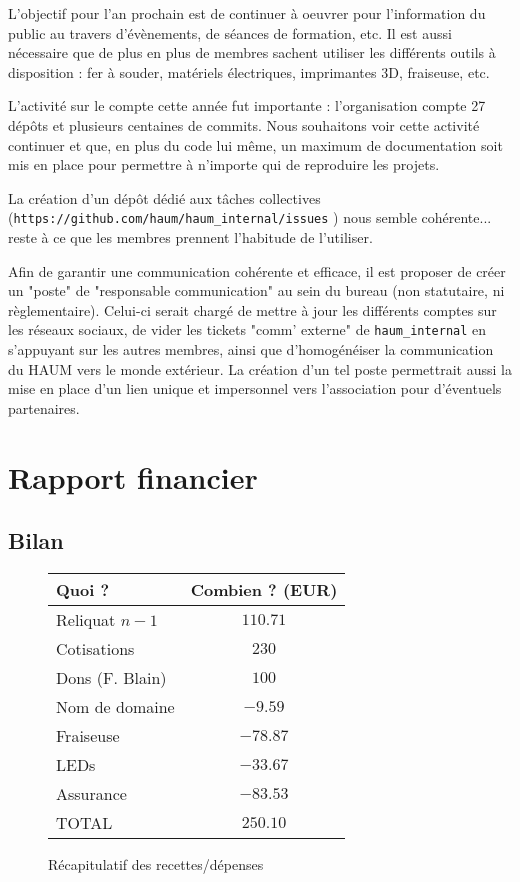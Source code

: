 \documentclass[a4paper, 11pt]{article}
\begin{document}
L'objectif pour l'an prochain est de continuer à oeuvrer pour l'information du public au travers d'évènements, de séances de formation, etc.
Il est aussi nécessaire que de plus en plus de membres sachent utiliser les différents outils à disposition : fer à souder, matériels électriques, imprimantes 3D, fraiseuse, etc.

L'activité sur le compte cette année fut importante : l'organisation compte 27 dépôts et plusieurs centaines de commits. Nous souhaitons voir cette activité continuer et que, en plus du code lui même, un maximum de documentation soit mis en place pour permettre à n'importe qui de reproduire les projets.

La création d'un dépôt dédié aux tâches collectives (\texttt{https://github.com/haum/haum\_internal/issues} ) nous semble cohérente... reste à ce que les membres prennent l'habitude de l'utiliser.

Afin de garantir une communication cohérente et efficace, il est proposer de créer un "poste" de "responsable communication" au sein du bureau (non statutaire, ni règlementaire).
Celui-ci serait chargé de mettre à jour les différents comptes sur les réseaux sociaux, de vider les tickets "comm' externe" de \texttt{haum\_internal} en s'appuyant sur les autres
membres, ainsi que d'homogénéiser la communication du HAUM vers le monde extérieur. La création d'un tel poste permettrait aussi la mise en place d'un lien unique et impersonnel vers l'association pour d'éventuels partenaires.

\section{Rapport financier}

\subsection{Bilan}

\begin{figure}[h]
\centering
\begin{tabular}{l|c}
Quoi ? & Combien ? (EUR)  \\\hline
Reliquat $n-1$ & $110.71$\\
Cotisations & $230$ \\
Dons (F. Blain) & $100$ \\
Nom de domaine & $-9.59$\\
Fraiseuse & $-78.87$\\
LEDs & $-33.67$\\
Assurance & $-83.53$\\\hline\hline
TOTAL & $250.10$\\
\end{tabular}
\caption{Récapitulatif des recettes/dépenses}
\end{figure}
\end{document}

